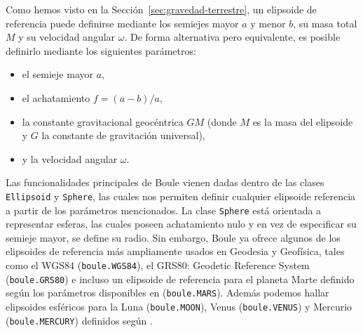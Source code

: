 Como hemos visto en la Sección~\ref{sec:gravedad-terrestre}, un elipsoide de
referencia puede definirse mediante los semiejes mayor $a$ y menor $b$, su masa
total $M$ y su velocidad angular $\omega$.
De forma alternativa pero equivalente, es posible definirlo mediante los
siguientes parámetros:
%
\begin{itemize}
    \item el semieje mayor $a$,
    \item el achatamiento $f = (a - b) / a$,
    \item la constante gravitacional geocéntrica $GM$ (donde $M$ es la masa
        del elipsoide y $G$ la constante de gravitación universal),
    \item y la velocidad angular $\omega$.
\end{itemize}

Las funcionalidades principales de Boule vienen dadas dentro de las clases
\texttt{Ellipsoid} y \texttt{Sphere}, las cuales nos permiten definir
cualquier elipsoide referencia a partir de los parámetros mencionados.
La clase \texttt{Sphere} está orientada a representar esferas, las cuales
poseen achatamiento nulo y en vez de especificar su semieje mayor, se define su
radio.
Sin embargo, Boule ya ofrece algunos de los elipsoides de referencia más
ampliamente usados en Geodesia y Geofísica, tales como el WGS84
(\texttt{boule.WGS84}), el GRS80: Geodetic Reference System
(\texttt{boule.GRS80}) e incluso un elipsoide de referencia para el planeta
Marte definido según los parámetros disponibles en \citet{ardalan2009}
(\texttt{boule.MARS}).
Además podemos hallar elipsoides esféricos para la Luna (\texttt{boule.MOON}),
Venus (\texttt{boule.VENUS}) y Mercurio (\texttt{boule.MERCURY}) definidos
según \citet{wieczorek2015}.

